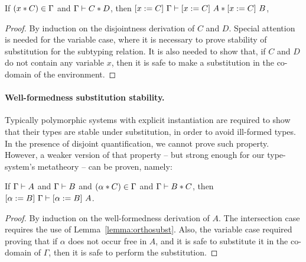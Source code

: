 \begin{lemma}
  \label{lemma:orthosubst}

  If $(x \disjoint C) \in \Gamma$ and $\jdis \Gamma C D$, 
  then $\jdis {\subst C x \Gamma} {\subst C x A} {\subst C x B}$,
\end{lemma}

\begin{proof}
  By induction on the disjointness derivation of $C$ and $D$.
  Special attention is needed for the variable case, where it is necessary to prove stability
  of substitution for the subtyping relation.
  It is also needed to show that, if $C$ and $D$ do not contain any variable $x$, then it is
  safe to make a substitution in the co-domain of the environment.
\end{proof}

\paragraph{Well-formedness substitution stability.}
Typically polymorphic systems with explicit instantiation are required to show that their
types are stable under substitution, in order to avoid ill-formed types.
In the presence of disjoint quantification, we cannot prove such property.
However, a weaker version of that property -- but strong enough for our type-system's metatheory 
-- can be proven, namely:

\begin{lemma}
  \label{lemma:wfsubst}

  If $\jwf \Gamma A$ and $\jwf \Gamma B$ and $(\alpha \disjoint C) \in \Gamma$ 
  and $\jdis \Gamma B C$, then $\jwf {\subst B \alpha \Gamma} {\subst B \alpha A}$.
\end{lemma}
%

\begin{proof}
By induction on the well-formedness derivation of $A$.
The intersection case requires the use of Lemma~\ref{lemma:orthosubst}.
Also, the variable case required proving that if $\alpha$ does not occur free in $A$, and it is safe
to substitute it in the co-domain of $\Gamma$, then it is safe to perform the substitution.
\end{proof}

